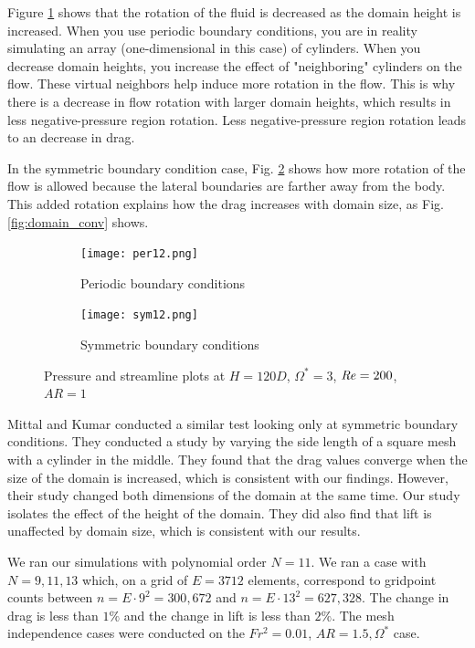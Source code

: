 Figure \ref{fig:per12} shows that the rotation of the fluid is decreased as the domain height is increased. When you use periodic boundary conditions, you are in reality simulating an array (one-dimensional in this case) of cylinders. When you decrease domain heights, you increase the effect of "neighboring" cylinders on the flow. These virtual neighbors help induce more rotation in the flow. This is why there is a decrease in flow rotation with larger domain heights, which results in less negative-pressure region rotation. Less negative-pressure region rotation leads to an decrease in drag.  

In the symmetric boundary condition case, Fig. \ref{fig:sym12} shows how more rotation of the flow is allowed because the lateral boundaries are farther away from the body. This added rotation explains how the drag increases with domain size, as Fig. \ref{fig:domain_conv} shows.  
\begin{figure}
    \centering
    \begin{subfigure}{0.49\textwidth}
    \texttt{[image: per12.png]}
    \caption{Periodic boundary conditions}
    \label{fig:per12}
    \end{subfigure}
    \begin{subfigure}{0.49\textwidth}
    \texttt{[image: sym12.png]}
    \caption{Symmetric boundary conditions}
    \label{fig:sym12}
    \end{subfigure}
    \caption{Pressure and streamline plots at $H=120D$, $\Omega^{\ast} = 3$, $\mathit{Re} = 200$, $AR = 1$}
    \label{fig:per sym12}
\end{figure}

Mittal and Kumar \cite{mittal_flow_2003} conducted a similar test looking only at symmetric boundary conditions. They conducted a study by varying the side length of a square mesh with a cylinder in the middle. They found that the drag values converge when the size of the domain is increased, which is consistent with our findings. However, their study changed both dimensions of the domain at the same time. Our study isolates the effect of the height of the domain. They did also find that lift is unaffected by domain size, which is consistent with our results. 

We ran our simulations with polynomial order $N = 11$. We ran a case with $N = 9, 11, 13$ which, on a grid of $E = 3712$ elements, correspond to gridpoint counts between $n = E \cdot 9^2 = 300,672$ and $n = E \cdot 13^2 = 627,328$. The change in drag is less than $1\%$ and the change in lift is less than $2\%$. The mesh independence cases were conducted on the $Fr^2 = 0.01$, $AR = 1.5, \Omega^{\ast}$ case.

